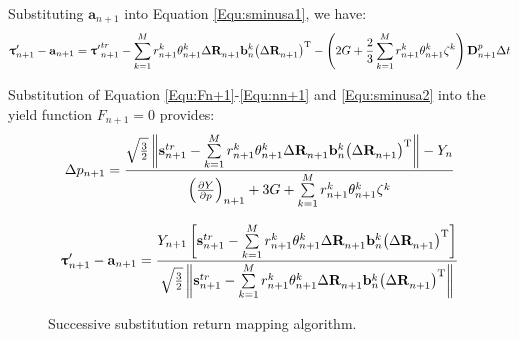 Substituting ${{\mathbf{a}}_{n + 1}}$ into Equation \ref{Equ:sminusa1}, we have:
\begin{equation}
\label{Equ:sminusa2}
\begin{aligned}
{{\bm{\uptau }}'_{n + 1} - {{\mathbf{a}}_{n + 1}}}=
{{\bm{\uptau }}'}_{n + 1}^{tr} - \sum\limits_{k = 1}^M {r_{n + 1}^k\theta _{n + 1}^k \Delta {\mathbf{R}}_{n + 1}^{}{\mathbf{b}}_n^k{\left( {\Delta {\mathbf{R}}_{n + 1}^{}} \right)^{\rm{T}}} }
- \left( {2G + \frac{2}{3}\sum\limits_{k = 1}^M {r_{n + 1}^k\theta _{n + 1}^k{\zeta ^k}} } \right){\mathbf{D }}_{n + 1}^p \Delta t
\end{aligned}
\end{equation}

Substitution of Equation \ref{Equ:Fn+1}-\ref{Equ:nn+1} and \ref{Equ:sminusa2} into the yield function ${F_{n + 1}} = 0$ provides:
\begin{equation}
\Delta {p_{n + 1}} = \frac{{\sqrt {\frac{3}{2}} \left\| {{\mathbf{s}}_{n + 1}^{tr} - \sum\limits_{k = 1}^M {r_{n + 1}^k\theta _{n + 1}^k \Delta {\mathbf{R}}_{n + 1}^{}{\mathbf{b}}_n^k{\left( {\Delta {\mathbf{R}}_{n + 1}^{}} \right)^{\rm{T}}} } } \right\| - {Y_n}}}{{{{\left( {\frac{{\partial Y}}{{\partial p}}} \right)}_{n + 1}} + 3G + \sum\limits_{k = 1}^M {r_{n + 1}^k\theta _{n + 1}^k{\zeta ^k}} }}
\end{equation}

\begin{equation}
{{\bm{\uptau }}'_{n + 1} - {{\mathbf{a}}_{n + 1}}} = \frac{{{Y_{n + 1}}\left[ {{\mathbf{s}}_{n + 1}^{tr} - \sum\limits_{k = 1}^M {r_{n + 1}^k\theta _{n + 1}^k \Delta {\mathbf{R}}_{n + 1}^{}{\mathbf{b}}_n^k{\left( {\Delta {\mathbf{R}}_{n + 1}^{}} \right)^{\rm{T}}}} } \right]}}{{\sqrt {\frac{3}{2}} \left\| {{\mathbf{s}}_{n + 1}^{tr} - \sum\limits_{k = 1}^M {r_{n + 1}^k\theta _{n + 1}^k \Delta {\mathbf{R}}_{n + 1}^{}{\mathbf{b}}_n^k{\left( {\Delta {\mathbf{R}}_{n + 1}^{}} \right)^{\rm{T}}}} } \right\|}}
\end{equation}
\begin{figure}[!htp]
\centering{}
\caption{Successive substitution return mapping algorithm.}
\label{Fig:radial_return_map}
\end{figure}

